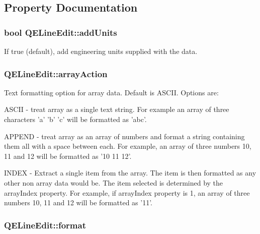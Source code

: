 \subsection{Property Documentation}
\hypertarget{classQELineEdit_ae9566b82c2f0fe4e445982721b7e1a80}{
\subsubsection[{addUnits}]{\setlength{\rightskip}{0pt plus 5cm}bool QELineEdit::addUnits}}
\label{classQELineEdit_ae9566b82c2f0fe4e445982721b7e1a80}
If true (default), add engineering units supplied with the data. \hypertarget{classQELineEdit_aae37b6857fe07e38e9c1b56496673a59}{
\subsubsection[{arrayAction}]{ QELineEdit::arrayAction}}
\label{classQELineEdit_aae37b6857fe07e38e9c1b56496673a59}
Text formatting option for array data. Default is ASCII. Options are: \begin{DoxyItemize}
\item ASCII -\/ treat array as a single text string. For example an array of three characters 'a' 'b' 'c' will be formatted as 'abc'. \item APPEND -\/ treat array as an array of numbers and format a string containing them all with a space between each. For example, an array of three numbers 10, 11 and 12 will be formatted as '10 11 12'. \item INDEX -\/ Extract a single item from the array. The item is then formatted as any other non array data would be. The item selected is determined by the arrayIndex property. For example, if arrayIndex property is 1, an array of three numbers 10, 11 and 12 will be formatted as '11'. \end{DoxyItemize}
\hypertarget{classQELineEdit_a898821256a4bab25580a3007fffa44c2}{
\subsubsection[{format}]{ QELineEdit::format}}
